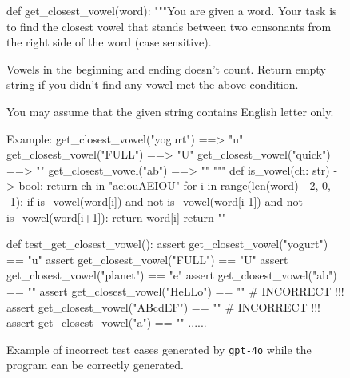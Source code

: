 \begin{figure*}[t]
\begin{python}
def get_closest_vowel(word):
    """You are given a word. Your task is to find the closest vowel that stands between 
    two consonants from the right side of the word (case sensitive).
    
    Vowels in the beginning and ending doesn't count. Return empty string if you didn't
    find any vowel met the above condition. 

    You may assume that the given string contains English letter only.

    Example:
    get_closest_vowel("yogurt") ==> "u"
    get_closest_vowel("FULL") ==> "U"
    get_closest_vowel("quick") ==> ""
    get_closest_vowel("ab") ==> ""
    """
    def is_vowel(ch: str) -> bool:
        return ch in "aeiouAEIOU"
    for i in range(len(word) - 2, 0, -1):
        if is_vowel(word[i]) and not is_vowel(word[i-1]) and not is_vowel(word[i+1]):
            return word[i]
    return ""

def test_get_closest_vowel():
    assert get_closest_vowel("yogurt") == "u"
    assert get_closest_vowel("FULL") == "U"
    assert get_closest_vowel("planet") == "e"
    assert get_closest_vowel("ab") == ""
    assert get_closest_vowel("HeLLo") == ""  # INCORRECT !!!
    assert get_closest_vowel("ABcdEF") == "" # INCORRECT !!!
    assert get_closest_vowel("a") == ""
    ......

\end{python}
\caption{Example of incorrect test cases generated by \texttt{gpt-4o} while the program can be correctly generated. }
\label{fig:program}
\end{figure*}


